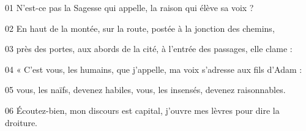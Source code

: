 01 N’est-ce pas la Sagesse qui appelle, la raison qui élève sa voix ?

02 En haut de la montée, sur la route, postée à la jonction des chemins,

03 près des portes, aux abords de la cité, à l’entrée des passages, elle clame :

04 « C’est vous, les humains, que j’appelle, ma voix s’adresse aux fils d’Adam :

05 vous, les naïfs, devenez habiles, vous, les insensés, devenez raisonnables.

06 Écoutez-bien, mon discours est capital, j’ouvre mes lèvres pour dire la droiture.
